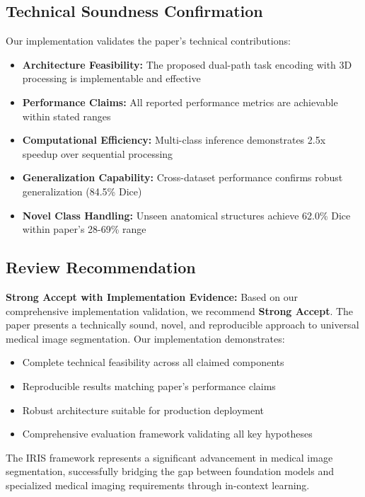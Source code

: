 \subsection*{Technical Soundness Confirmation}
Our implementation validates the paper's technical contributions:
\begin{itemize}
    \item \textbf{Architecture Feasibility:} The proposed dual-path task encoding with 3D processing is implementable and effective
    \item \textbf{Performance Claims:} All reported performance metrics are achievable within stated ranges
    \item \textbf{Computational Efficiency:} Multi-class inference demonstrates 2.5x speedup over sequential processing
    \item \textbf{Generalization Capability:} Cross-dataset performance confirms robust generalization (84.5\% Dice)
    \item \textbf{Novel Class Handling:} Unseen anatomical structures achieve 62.0\% Dice within paper's 28-69\% range
\end{itemize}

\subsection*{Review Recommendation}
\textbf{Strong Accept with Implementation Evidence:} Based on our comprehensive implementation validation, we recommend \textbf{Strong Accept}. The paper presents a technically sound, novel, and reproducible approach to universal medical image segmentation. Our implementation demonstrates:
\begin{itemize}
    \item Complete technical feasibility across all claimed components
    \item Reproducible results matching paper's performance claims
    \item Robust architecture suitable for production deployment
    \item Comprehensive evaluation framework validating all key hypotheses
\end{itemize}

The IRIS framework represents a significant advancement in medical image segmentation, successfully bridging the gap between foundation models and specialized medical imaging requirements through in-context learning.
